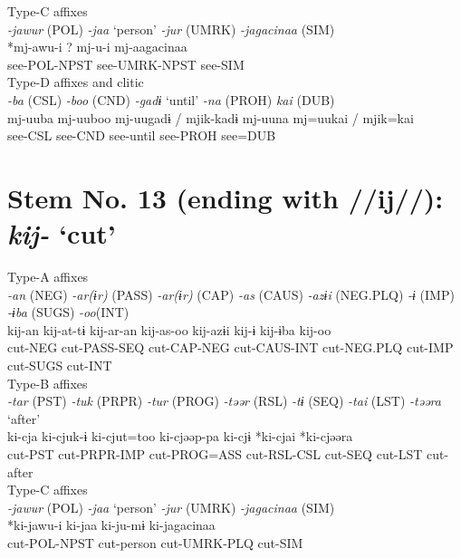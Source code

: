 \ex Type-C affixes\\
\glll \textit{-jawur} (POL)  \textit{-jaa} ‘person’  \textit{-jur} (UMRK)  \textit{-jagacinaa} (SIM)\\
*mj-awu-i  ?  mj-u-i  mj-aagacinaa\\
see-POL-NPST    see-UMRK-NPST  see-SIM\\


\ex Type-D affixes and clitic\\
\glll \textit{-ba} (CSL)  \textit{-boo} (CND)  \textit{-gadɨ} ‘until’  \textit{-na} (PROH)  \textit{kai} (DUB)\\
mj-uuba  mj-uuboo  mj-uugadɨ / mjik-kadɨ  mj-uuna  mj=uukai / mjik=kai\\
see-CSL  see-CND  see-until  see-PROH  see=DUB\\
\z

\section{Stem No. 13 (ending with //ij//): \textit{kij-} ‘cut’}

\ea Type-A affixes\\
\glll \textit{-an} (NEG)  \textit{-ar(ɨr)} (PASS)  \textit{-ar(ɨr)} (CAP)  \textit{-as} (CAUS)  \textit{-azɨi} (NEG.PLQ)  \textit{-ɨ} (IMP)  \textit{-ɨba} (SUGS)  \textit{-oo}(INT)\\
kij-an  kij-at-tɨ  kij-ar-an  kij-as-oo  kij-azɨi  kij-ɨ  kij-ɨba  kij-oo\\
cut-NEG  cut-PASS-SEQ  cut-CAP-NEG  cut-CAUS-INT  cut-NEG.PLQ  cut-IMP  cut-SUGS  cut-INT\\


\ex Type-B affixes\\
\glll \textit{-tar} (PST)  \textit{-tuk} (PRPR)  \textit{-tur} (PROG)  \textit{-təər} (RSL)  \textit{-tɨ} (SEQ)  \textit{-tai} (LST)  \textit{-təəra} ‘after’\\
ki-cja  ki-cjuk-ɨ  ki-cjut=too  ki-cjəəp-pa  ki-cjɨ  *ki-cjai  *ki-cjəəra\\
cut-PST  cut-PRPR-IMP  cut-PROG=ASS  cut-RSL-CSL  cut-SEQ  cut-LST  cut-after\\


\ex Type-C affixes\\
\glll \textit{-jawur} (POL)  \textit{-jaa} ‘person’  \textit{-jur} (UMRK)  \textit{-jagacinaa} (SIM)\\
*ki-jawu-i  ki-jaa  ki-ju-mɨ  ki-jagacinaa\\
cut-POL-NPST  cut-person  cut-UMRK-PLQ  cut-SIM\\


